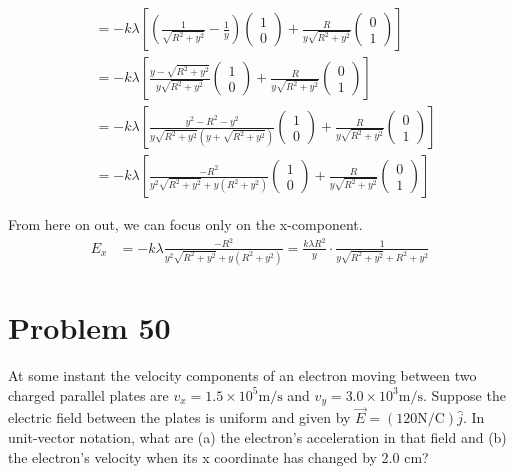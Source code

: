 \documentclass[12pt]{article}
\begin{document}
\begin{align*}
        &=  -k\lambda \left[\left(\frac{1}{\sqrt{R^2 + y^2}} - \frac{1}{y}\right) \begin{pmatrix}1\\0\end{pmatrix} + \frac{R}{y\sqrt{R^2 + y^2}} \begin{pmatrix}0\\1\end{pmatrix}\right]\\
        &=  -k\lambda \left[\frac{y - \sqrt{R^2 + y^2}}{y\sqrt{R^2 + y^2}} \begin{pmatrix}1\\0\end{pmatrix} + \frac{R}{y\sqrt{R^2 + y^2}} \begin{pmatrix}0\\1\end{pmatrix}\right]\\
        &=  -k\lambda \left[\frac{y^2 - R^2 - y^2}{y\sqrt{R^2 + y^2}(y + \sqrt{R^2 + y^2})} \begin{pmatrix}1\\0\end{pmatrix} + \frac{R}{y\sqrt{R^2 + y^2}} \begin{pmatrix}0\\1\end{pmatrix}\right]\\
        &=  -k\lambda \left[\frac{-R^2}{y^2\sqrt{R^2 + y^2} + y(R^2 + y^2)} \begin{pmatrix}1\\0\end{pmatrix} + \frac{R}{y\sqrt{R^2 + y^2}} \begin{pmatrix}0\\1\end{pmatrix}\right]
\end{align*}

From here on out, we can focus only on the x-component.
\begin{align*}
    E_x &=  -k\lambda \frac{-R^2}{y^2\sqrt{R^2 + y^2} + y(R^2 + y^2)}
        =   \frac{k\lambda R^2}{y} \cdot \frac{1}{y\sqrt{R^2 + y^2} + R^2 + y^2}
\end{align*}

\pagebreak
\section{Problem 50}
At some instant the velocity components of an electron moving between two charged parallel plates are $v_x = 1.5 \times 10^5 \unit{\meter/\second}$ and $v_y = 3.0 \times 10^3 \unit{\meter/\second}$. Suppose the electric field between the plates is uniform and given by $\vec{E} = (120 \unit{\newton/\coulomb})\hat{j}$. In unit-vector notation, what are (a) the electron's acceleration in that field and (b) the electron's velocity when its x coordinate has changed by 2.0 cm?
\end{document}
